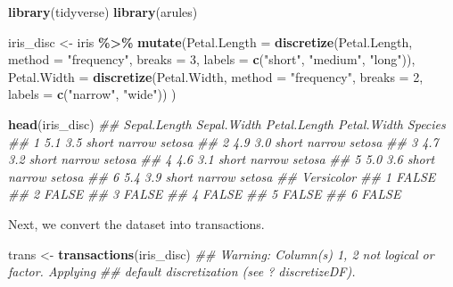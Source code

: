 \documentclass[
  notitlepage]{book}
\newenvironment{Shaded}{\begin{snugshade}}{\end{snugshade}}
\newcommand{\CommentTok}[1]{\textcolor[rgb]{0.56,0.35,0.01}{\textit{#1}}}
\newcommand{\DataTypeTok}[1]{\textcolor[rgb]{0.13,0.29,0.53}{#1}}
\newcommand{\DecValTok}[1]{\textcolor[rgb]{0.00,0.00,0.81}{#1}}
\newcommand{\KeywordTok}[1]{\textcolor[rgb]{0.13,0.29,0.53}{\textbf{#1}}}
\newcommand{\NormalTok}[1]{#1}
\newcommand{\OperatorTok}[1]{\textcolor[rgb]{0.81,0.36,0.00}{\textbf{#1}}}
\newcommand{\StringTok}[1]{\textcolor[rgb]{0.31,0.60,0.02}{#1}}
\begin{document}
\begin{Shaded}
\begin{Highlighting}[]
\KeywordTok{library}\NormalTok{(tidyverse)}
\KeywordTok{library}\NormalTok{(arules)}

\NormalTok{iris\_disc \textless{}{-}}\StringTok{ }\NormalTok{iris }\OperatorTok{\%\textgreater{}\%}\StringTok{ }
\StringTok{  }\KeywordTok{mutate}\NormalTok{(}\DataTypeTok{Petal.Length =} \KeywordTok{discretize}\NormalTok{(Petal.Length, }
                          \DataTypeTok{method =} \StringTok{"frequency"}\NormalTok{, }
                          \DataTypeTok{breaks =} \DecValTok{3}\NormalTok{, }
                          \DataTypeTok{labels =} \KeywordTok{c}\NormalTok{(}\StringTok{"short"}\NormalTok{, }\StringTok{"medium"}\NormalTok{, }\StringTok{"long"}\NormalTok{)),}
         \DataTypeTok{Petal.Width =} \KeywordTok{discretize}\NormalTok{(Petal.Width,}
                          \DataTypeTok{method =} \StringTok{"frequency"}\NormalTok{, }
                          \DataTypeTok{breaks =} \DecValTok{2}\NormalTok{, }
                          \DataTypeTok{labels =} \KeywordTok{c}\NormalTok{(}\StringTok{"narrow"}\NormalTok{, }\StringTok{"wide"}\NormalTok{))}
\NormalTok{         )}
  

\KeywordTok{head}\NormalTok{(iris\_disc)}
\CommentTok{\#\#   Sepal.Length Sepal.Width Petal.Length Petal.Width Species}
\CommentTok{\#\# 1          5.1         3.5        short      narrow  setosa}
\CommentTok{\#\# 2          4.9         3.0        short      narrow  setosa}
\CommentTok{\#\# 3          4.7         3.2        short      narrow  setosa}
\CommentTok{\#\# 4          4.6         3.1        short      narrow  setosa}
\CommentTok{\#\# 5          5.0         3.6        short      narrow  setosa}
\CommentTok{\#\# 6          5.4         3.9        short      narrow  setosa}
\CommentTok{\#\#   Versicolor}
\CommentTok{\#\# 1      FALSE}
\CommentTok{\#\# 2      FALSE}
\CommentTok{\#\# 3      FALSE}
\CommentTok{\#\# 4      FALSE}
\CommentTok{\#\# 5      FALSE}
\CommentTok{\#\# 6      FALSE}
\end{Highlighting}
\end{Shaded}

Next, we convert the dataset into transactions.

\begin{Shaded}
\begin{Highlighting}[]
\NormalTok{trans \textless{}{-}}\StringTok{ }\KeywordTok{transactions}\NormalTok{(iris\_disc)}
\CommentTok{\#\# Warning: Column(s) 1, 2 not logical or factor. Applying}
\CommentTok{\#\# default discretization (see \textquotesingle{}? discretizeDF\textquotesingle{}).}
\end{Highlighting}
\end{Shaded}
\end{document}
